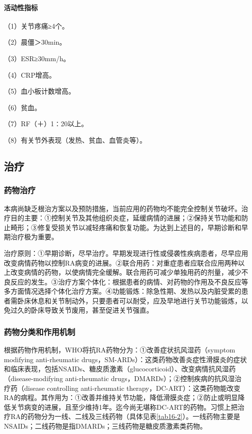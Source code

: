 \paragraph{活动性指标}

（1）关节疼痛≥4个。

（2）晨僵＞30min。

（3）ESR≥30mm/h。

（4）CRP增高。

（5）血小板计数增高。

（6）贫血。

（7）RF（＋）1∶20以上。

（8）有关节外表现（发热、贫血、血管炎等）。

\subsection{治疗}

\subsubsection{药物治疗}

本病尚缺乏根治方案以及预防措施，当前应用的药物均不能完全控制关节破坏。治疗目的主要：①控制关节及其他组织炎症，延缓病情的进展；②保持关节功能和防止畸形；③修复受损关节以减轻疼痛和恢复功能。为达到上述目的，早期诊断和早期治疗极为重要。

治疗原则：①早期诊断，尽早治疗。早期发现进行性或侵袭性疾病患者，尽早应用改变病情药物以控制RA病变的进展。②联合用药：对重症患者应联合应用两种以上改变病情的药物，以使病情完全缓解。联合用药可减少单独用药的剂量，减少不良反应的发生。③治疗方案个体化：根据患者的病情、对药物的作用及不良反应等多方面情况选择个体化治疗方案。④功能锻炼：除急性期、发热以及内脏受累的患者需卧床休息和关节制动外，只要患者可以耐受，应及早地进行关节功能锻炼，以免过久的卧床导致关节废用，甚至促进关节强直。

\subsubsection{药物分类和作用机制}

根据药物作用机制，WHO将抗RA药物分为：①改善症状抗风湿药（symptom
modifying anti-rheumatic
drugs，SM-ARDs）：这类药物改善炎症性滑膜炎的症状和临床表现，包括NSAIDs、糖皮质激素（glucocorticoid）、改变病情抗风湿药（disease-modifying
anti-rheumatic drugs，DMARDs）；②控制疾病的抗风湿治疗药（disease
controlling anti-rheumatic
therapy，DC-ART）：这类药物能改变RA的病程。其作用为：①改善并维持关节功能，降低滑膜炎症；②防止或明显降低关节病变的进展，且至少维持1年。迄今尚无堪称DC-ART的药物。习惯上把治疗RA的药物分为一线、二线及三线药物（具体见表\ref{tab16-2}）。一线药物主要是NSAIDs；二线药物是指DMARDs；三线药物是糖皮质激素类药物。

